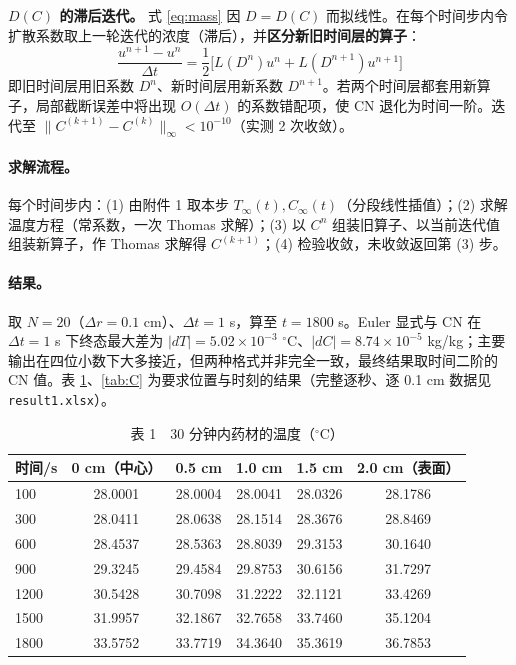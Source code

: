 \textbf{$D(C)$ 的滞后迭代。} 式 \eqref{eq:mass} 因 $D=D(C)$ 而拟线性。在每个时间步内令扩散系数取上一轮迭代的浓度（滞后），并\textbf{区分新旧时间层的算子}：
\begin{equation}
  \frac{u^{n+1}-u^{n}}{\Delta t}
  =\frac12\Big[L(D^n)u^{n}+L(D^{n+1})u^{n+1}\Big]
  \label{eq:cn_varc}
\end{equation}
即旧时间层用旧系数 $D^n$、新时间层用新系数 $D^{n+1}$。若两个时间层都套用新算子，局部截断误差中将出现 $O(\Delta t)$ 的系数错配项，使 CN 退化为时间一阶。迭代至 $\|C^{(k+1)}-C^{(k)}\|_\infty<10^{-10}$（实测 2 次收敛）。

\paragraph{求解流程。} 每个时间步内：(1) 由附件 1 取本步 $T_\infty(t),C_\infty(t)$（分段线性插值）；(2) 求解温度方程（常系数，一次 Thomas 求解）；(3) 以 $C^n$ 组装旧算子、以当前迭代值组装新算子，作 Thomas 求解得 $C^{(k+1)}$；(4) 检验收敛，未收敛返回第 (3) 步。

\paragraph{结果。} 取 $N=20$（$\Delta r=0.1$ cm）、$\Delta t=1$ s，算至 $t=1800$ s。Euler 显式与 CN 在 $\Delta t=1$ s 下终态最大差为 $|dT|=5.02\times10^{-3}$ $^\circ$C、$|dC|=8.74\times10^{-5}$ kg/kg；主要输出在四位小数下大多接近，但两种格式并非完全一致，最终结果取时间二阶的 CN 值。表 \ref{tab:T}、\ref{tab:C} 为要求位置与时刻的结果（完整逐秒、逐 0.1 cm 数据见 \texttt{result1.xlsx}）。

\begin{table}[H]
  \centering
  \caption{表 1　30 分钟内药材的温度（$^\circ$C）}
  \label{tab:T}
  \begin{tabular}{lccccc}
    \toprule
    时间/s & 0 cm（中心） & 0.5 cm & 1.0 cm & 1.5 cm & 2.0 cm（表面） \\
    \midrule
    100  & 28.0001 & 28.0004 & 28.0041 & 28.0326 & 28.1786 \\
    300  & 28.0411 & 28.0638 & 28.1514 & 28.3676 & 28.8469 \\
    600  & 28.4537 & 28.5363 & 28.8039 & 29.3153 & 30.1640 \\
    900  & 29.3245 & 29.4584 & 29.8753 & 30.6156 & 31.7297 \\
    1200 & 30.5428 & 30.7098 & 31.2222 & 32.1121 & 33.4269 \\
    1500 & 31.9957 & 32.1867 & 32.7658 & 33.7460 & 35.1204 \\
    1800 & 33.5752 & 33.7719 & 34.3640 & 35.3619 & 36.7853 \\
    \bottomrule
  \end{tabular}
\end{table}

